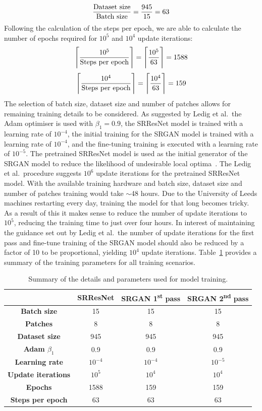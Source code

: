 \[\frac{\textnormal{Dataset size}}{\textnormal{Batch size}} = \frac{945}{15} = 63\]
Following the calculation of the steps per epoch, we are able to calculate the number of epochs required for $10^5$ and $10^4$ update iterations:
\[\Bigg\lceil\frac{10^5}{\textnormal{Steps per epoch}}\Bigg\rceil = \Bigg\lceil\frac{10^5}{63}\Bigg\rceil = 1588\]
\[\Bigg\lceil\frac{10^4}{\textnormal{Steps per epoch}}\Bigg\rceil = \Bigg\lceil\frac{10^4}{63}\Bigg\rceil = 159\]
The selection of batch size, dataset size and number of patches allows for remaining training details to be considered. As suggested by Ledig et al.\ the Adam optimiser is used with $\beta_1 = 0.9$, the SRResNet model is trained with a learning rate of $10^{-4}$, the initial training for the SRGAN model is trained with a learning rate of $10^{-4}$, and the fine-tuning training is executed with a learning rate of $10^{-5}$. The pretrained SRResNet model is used as the initial generator of the SRGAN model to reduce the likelihood of undesirable local optima~\cite{srgan}. The Ledig et al.\ procedure suggests $10^6$ update iterations for the pretrained SRResNet model. With the available training hardware and batch size, dataset size and number of patches training would take $\sim$48 hours. Due to the University of Leeds machines restarting every day, training the model for that long becomes tricky. As a result of this it makes sense to reduce the number of update iterations to $10^{5}$, reducing the training time to just over four hours. In interest of maintaining the guidance set out by Ledig et al.\ the number of update iterations for the first pass and fine-tune training of the SRGAN model should also be reduced by a factor of 10 to be proportional, yielding $10^4$ update iterations. Table~\ref{table:model_training} provides a summary of the training parameters for all training scenarios.
\begin{table}
    \centering
    \begin{tabular}{cccc}
        \toprule
        {} & \textbf{SRResNet} & \textbf{SRGAN 1\textsuperscript{st} pass} & \textbf{SRGAN 2\textsuperscript{nd} pass} \\
        \midrule
        \textbf{Batch size} & 15 & 15 & 15\\ 
        \textbf{Patches} & 8 & 8 & 8 \\
        \textbf{Dataset size} & 945 & 945 & 945\\
        \textbf{Adam $\beta_1$} & 0.9 & 0.9 & 0.9\\
        \textbf{Learning rate} & $10^{-4}$ & $10^{-4}$ & $10^{-5}$ \\
        \textbf{Update iterations} & $10^5$ & $10^4$ & $10^4$ \\
        \textbf{Epochs} & 1588 & 159 & 159 \\
        \textbf{Steps per epoch} & 63 & 63 & 63 \\
        \bottomrule
    \end{tabular}
    \caption{Summary of the details and parameters used for model training.}
    \label{table:model_training}
\end{table}

